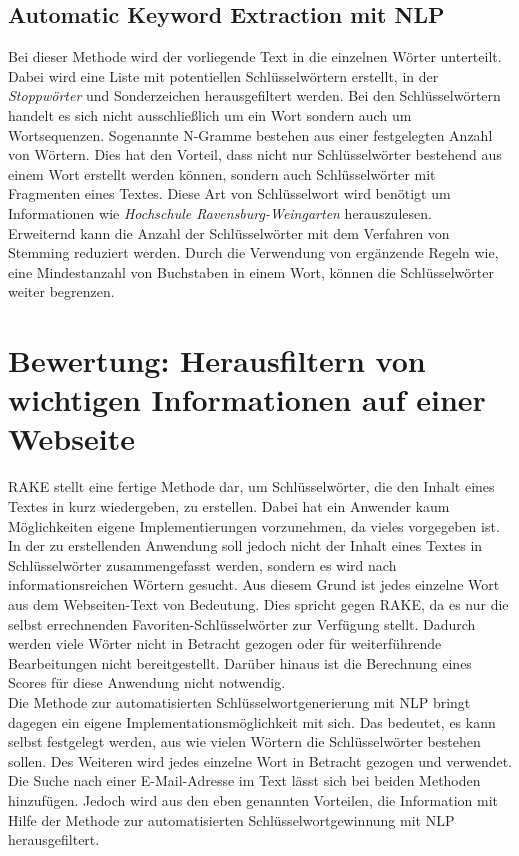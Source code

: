 	\subsection{Automatic Keyword Extraction mit NLP}
	\label{sec:Automatic Keyword Extraction}
	Bei dieser Methode wird der vorliegende Text in die einzelnen Wörter unterteilt. Dabei wird eine Liste mit potentiellen Schlüsselwörtern erstellt, in der \textit{Stoppwörter} und Sonderzeichen herausgefiltert werden. Bei den Schlüsselwörtern handelt es sich nicht ausschließlich um ein Wort sondern auch um Wortsequenzen. Sogenannte N-Gramme bestehen aus einer festgelegten Anzahl von Wörtern. Dies hat den Vorteil, dass nicht nur Schlüsselwörter bestehend aus einem Wort erstellt werden können, sondern auch Schlüsselwörter mit Fragmenten eines Textes. Diese Art von Schlüsselwort wird benötigt um Informationen wie \textit{Hochschule Ravensburg-Weingarten} herauszulesen.\\
	Erweiternd kann die Anzahl der Schlüsselwörter mit dem Verfahren von Stemming reduziert werden. Durch die Verwendung von ergänzende Regeln wie, eine Mindestanzahl von Buchstaben in einem Wort, können die Schlüsselwörter weiter begrenzen.

 

\section{Bewertung: Herausfiltern von wichtigen Informationen auf einer Webseite}
RAKE stellt eine fertige Methode dar, um Schlüsselwörter, die den Inhalt eines Textes in kurz wiedergeben, zu erstellen. Dabei hat ein Anwender kaum Möglichkeiten eigene Implementierungen vorzunehmen, da vieles vorgegeben ist. In der zu erstellenden Anwendung soll jedoch nicht der Inhalt eines Textes in Schlüsselwörter zusammengefasst werden, sondern es wird nach informationsreichen Wörtern gesucht. Aus diesem Grund ist jedes einzelne Wort aus dem Webseiten-Text von Bedeutung. Dies spricht gegen RAKE, da es nur die selbst errechnenden Favoriten-Schlüsselwörter zur Verfügung stellt. Dadurch werden viele Wörter nicht in Betracht gezogen oder für weiterführende Bearbeitungen nicht bereitgestellt. Darüber hinaus ist die Berechnung eines Scores für diese Anwendung nicht notwendig.\\
Die Methode zur automatisierten Schlüsselwortgenerierung mit NLP bringt dagegen ein eigene Implementationsmöglichkeit mit sich. Das bedeutet, es kann selbst festgelegt werden, aus wie vielen Wörtern die Schlüsselwörter bestehen sollen. Des Weiteren wird jedes einzelne Wort in Betracht gezogen und verwendet.\\ Die Suche nach einer E-Mail-Adresse im Text lässt sich bei beiden Methoden hinzufügen. Jedoch wird aus den eben genannten Vorteilen, die Information mit Hilfe der Methode zur automatisierten Schlüsselwortgewinnung mit NLP herausgefiltert.


